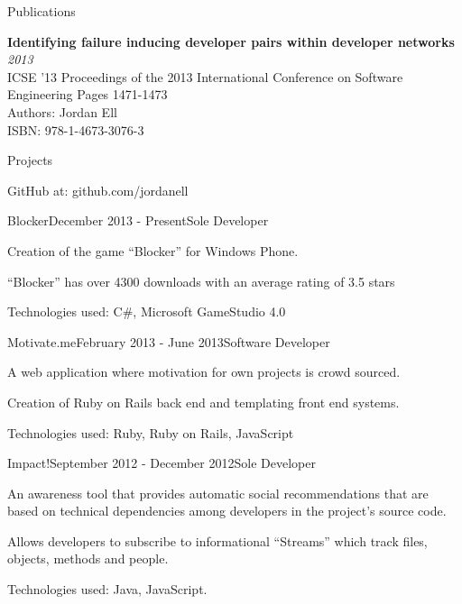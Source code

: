 \documentclass{resume} %
\begin{document}

\begin{rSection}{Publications}

{\bf Identifying failure inducing developer pairs within developer networks} \hfill {\em2013} \\ 
ICSE '13 Proceedings of the 2013 International Conference on Software Engineering Pages 1471-1473 \\
Authors: Jordan Ell \\
ISBN: 978-1-4673-3076-3

\end{rSection}


\begin{rSection}{Projects}

GitHub at: github.com/jordanell

\begin{rSubsection}{Blocker}{December 2013 - Present}{Sole Developer}{}
\item Creation of the game ``Blocker'' for Windows Phone.
\item ``Blocker'' has over 4300 downloads with an average rating of 3.5 stars 
\item Technologies used: C\#, Microsoft GameStudio 4.0
\end{rSubsection}

\begin{rSubsection}{Motivate.me}{February 2013 - June 2013}{Software Developer}{}
\item A web application where motivation for own projects is crowd sourced.
\item Creation of Ruby on Rails back end and templating front end systems. 
\item Technologies used: Ruby, Ruby on Rails, JavaScript
\end{rSubsection}

\begin{rSubsection}{Impact!}{September 2012 - December 2012}{Sole Developer}{}
\item An awareness tool that provides automatic social recommendations that are based on technical dependencies among developers in the project's source code.
\item Allows developers to subscribe to informational ``Streams'' which track files, objects, methods and people.
\item Technologies used: Java, JavaScript.
\end{rSubsection}

\end{rSection}
\end{document}
